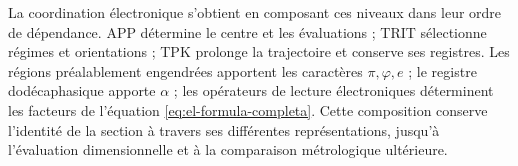 La coordination électronique s'obtient en composant ces niveaux dans leur
ordre de dépendance. APP détermine le centre et les évaluations ;
TRIT sélectionne régimes et orientations ; TPK prolonge la trajectoire
et conserve ses registres. Les régions préalablement engendrées apportent
les caractères \(\pi,\varphi,e\) ; le registre dodécaphasique apporte
\(\alpha\) ; les opérateurs de lecture électroniques déterminent les facteurs de
l'équation \eqref{eq:el-formula-completa}. Cette composition conserve
l'identité de la section à travers ses différentes
représentations, jusqu'à l'évaluation dimensionnelle et à la comparaison
métrologique ultérieure.
